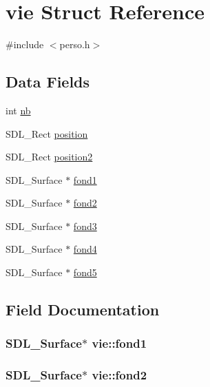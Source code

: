 \hypertarget{structvie}{}\section{vie Struct Reference}
\label{structvie}


{\ttfamily \#include $<$perso.\+h$>$}

\subsection*{Data Fields}
\begin{DoxyCompactItemize}
\item 
int \hyperlink{structvie_a02356445cb49a7290950ab15cebccdd9}{nb}
\item 
S\+D\+L\+\_\+\+Rect \hyperlink{structvie_a916050892cf1e7b8039952dcafa44825}{position}
\item 
S\+D\+L\+\_\+\+Rect \hyperlink{structvie_a564dc9c3b28da24d81318d703ebc4e59}{position2}
\item 
S\+D\+L\+\_\+\+Surface $\ast$ \hyperlink{structvie_a7616ae8ecc97b7fb2d92be6a858014ad}{fond1}
\item 
S\+D\+L\+\_\+\+Surface $\ast$ \hyperlink{structvie_a6ecad7f4161cb602faa27d2de9e3ee50}{fond2}
\item 
S\+D\+L\+\_\+\+Surface $\ast$ \hyperlink{structvie_a9763ef794bb12262f5826b911d20e42b}{fond3}
\item 
S\+D\+L\+\_\+\+Surface $\ast$ \hyperlink{structvie_a0b08072b8c7ec9e1adfd6e26b4fcb39f}{fond4}
\item 
S\+D\+L\+\_\+\+Surface $\ast$ \hyperlink{structvie_adabeccdf7e33dd53ac6d85a24fc3931d}{fond5}
\end{DoxyCompactItemize}


\subsection{Field Documentation}
\subsubsection[{\texorpdfstring{fond1}{fond1}}]{\setlength{\rightskip}{0pt plus 5cm}S\+D\+L\+\_\+\+Surface$\ast$ vie\+::fond1}\hypertarget{structvie_a7616ae8ecc97b7fb2d92be6a858014ad}{}\label{structvie_a7616ae8ecc97b7fb2d92be6a858014ad}
\subsubsection[{\texorpdfstring{fond2}{fond2}}]{\setlength{\rightskip}{0pt plus 5cm}S\+D\+L\+\_\+\+Surface$\ast$ vie\+::fond2}\hypertarget{structvie_a6ecad7f4161cb602faa27d2de9e3ee50}{}\label{structvie_a6ecad7f4161cb602faa27d2de9e3ee50}
